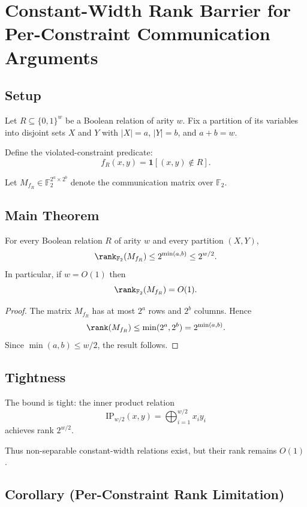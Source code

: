 \section{Constant-Width Rank Barrier for Per-Constraint Communication Arguments}

\subsection{Setup}

Let $R \subseteq \{0,1\}^w$ be a Boolean relation of arity $w$.
Fix a partition of its variables into disjoint sets $X$ and $Y$
with $|X|=a$, $|Y|=b$, and $a+b=w$.

Define the violated-constraint predicate:
\[
f_R(x,y) = \mathbf{1}[(x,y)\notin R].
\]

Let $M_{f_R} \in \mathbb{F}_2^{2^a \times 2^b}$
denote the communication matrix over $\mathbb{F}_2$.

\subsection{Main Theorem}

\begin{theorem}
For every Boolean relation $R$ of arity $w$ and every partition $(X,Y)$,
\[
\rank_{\mathbb{F}_2}(M_{f_R}) \le 2^{\min(a,b)} \le 2^{w/2}.
\]
In particular, if $w=O(1)$ then
\[
\rank_{\mathbb{F}_2}(M_{f_R}) = O(1).
\]
\end{theorem}

\begin{proof}
The matrix $M_{f_R}$ has at most $2^a$ rows and $2^b$ columns.
Hence
\[
\rank(M_{f_R}) \le \min(2^a,2^b)=2^{\min(a,b)}.
\]
Since $\min(a,b)\le w/2$, the result follows.
\end{proof}

\subsection{Tightness}

The bound is tight: the inner product relation
\[
\mathrm{IP}_{w/2}(x,y)=\bigoplus_{i=1}^{w/2} x_i y_i
\]
achieves rank $2^{w/2}$.

Thus non-separable constant-width relations exist,
but their rank remains $O(1)$.

\subsection{Corollary (Per-Constraint Rank Limitation)}

